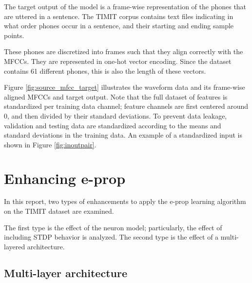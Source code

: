 			The target output of the model is a frame-wise representation of the phones that are uttered in a sentence.
			The TIMIT corpus contains text files indicating in what order phones occur in a sentence, and their starting and ending sample points.

			These phones are discretized into frames such that they align correctly with the MFCCs.
			They are represented in one-hot vector encoding.
			Since the dataset contains 61 different phones, this is also the length of these vectors.

			Figure \ref{fig:source_mfcc_target} illustrates the waveform data and its frame-wise aligned MFCCs and target output.
			Note that the full dataset of features is standardized per training data channel; feature channels are first centered around 0, and then divided by their standard deviations.
			To prevent data leakage, validation and testing data are standardized according to the means and standard deviations in the training data.
			An example of a standardized input is shown in Figure \ref{fig:inoutpair}.

\newpage


\section{Enhancing e-prop}

	In this report, two types of enhancements to apply the e-prop learning algorithm on the TIMIT dataset are examined.

	The first type is the effect of the neuron model; particularly, the effect of including STDP behavior is analyzed.
	The second type is the effect of a multi-layered architecture.

	\subsection{Multi-layer architecture}\label{sec:ml_arch}

